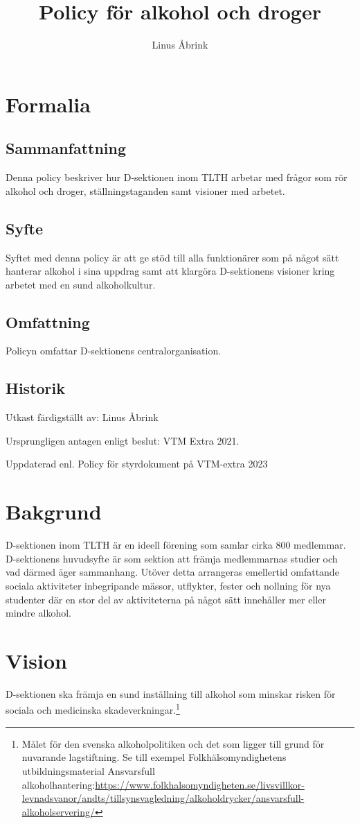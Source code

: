 \documentclass[]{dsekprotokoll}
\title{Policy för alkohol och droger}
\author{Linus Åbrink}
\begin{document}
\maketitle

\section{Formalia}

\subsection{Sammanfattning}
Denna policy beskriver hur D-sektionen inom TLTH arbetar med frågor som rör alkohol och droger, ställningstaganden samt visioner med arbetet.

\subsection{Syfte}
Syftet med denna policy är att ge stöd till alla funktionärer som på något sätt hanterar alkohol
i sina uppdrag samt att klargöra D-sektionens visioner kring arbetet med en sund alkoholkultur.

\subsection{Omfattning}
Policyn omfattar D-sektionens centralorganisation.

\subsection{Historik}
Utkast färdigställt av: Linus Åbrink

Ursprungligen antagen enligt beslut: VTM Extra 2021.

Uppdaterad enl. Policy för styrdokument på VTM-extra 2023


\section{Bakgrund}
D-sektionen inom TLTH är en ideell förening som samlar cirka 800 medlemmar. D-sektionens huvudsyfte är som sektion att främja medlemmarnas studier och vad därmed äger sammanhang. Utöver detta arrangeras emellertid omfattande sociala aktiviteter inbegripande mässor, utflykter, fester och nollning för nya studenter där en stor del av aktiviteterna på något sätt innehåller mer eller mindre alkohol.

\section{Vision}
D-sektionen ska främja en sund inställning till alkohol som minskar risken för sociala och
medicinska skadeverkningar.\footnote{Målet för den svenska alkoholpolitiken och det som ligger till grund för nuvarande lagstiftning. Se till exempel Folkhälsomyndighetens utbildningsmaterial Ansvarsfull alkoholhantering:\url{https://www.folkhalsomyndigheten.se/livsvillkor-levnadsvanor/andts/tillsynsvagledning/alkoholdrycker/ansvarsfull-alkoholservering/}
}
\end{document}
